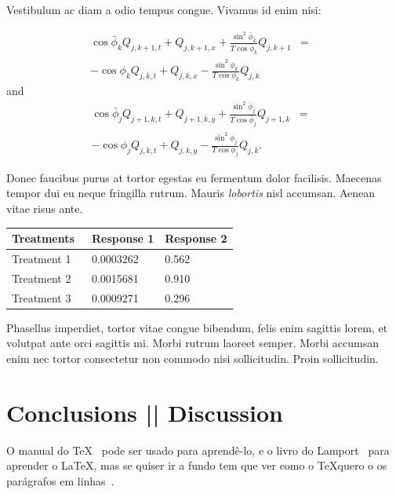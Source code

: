 \documentclass[portrait]{Hylangtechposter}
\begin{document}
\begin{multicols}{2}
Vestibulum ac diam a odio tempus congue. Vivamus id enim nisi:

\begin{eqnarray}
\cos\bar{\phi}_k Q_{j,k+1,t} + Q_{j,k+1,x}+\frac{\sin^2\bar{\phi}_k}{T\cos\bar{\phi}_k} Q_{j,k+1} &=&\nonumber\\ 
-\cos\phi_k Q_{j,k,t} + Q_{j,k,x}-\frac{\sin^2\phi_k}{T\cos\phi_k} Q_{j,k}\label{edgek}
\end{eqnarray}
and
\begin{eqnarray}
\cos\bar{\phi}_j Q_{j+1,k,t} + Q_{j+1,k,y}+\frac{\sin^2\bar{\phi}_j}{T\cos\bar{\phi}_j} Q_{j+1,k}&=&\nonumber \\
-\cos\phi_j Q_{j,k,t} + Q_{j,k,y}-\frac{\sin^2\phi_j}{T\cos\phi_j} Q_{j,k}.\label{edgej}
\end{eqnarray} 

Donec faucibus purus at tortor egestas eu fermentum dolor
facilisis. Maecenas tempor dui eu neque fringilla rutrum. Mauris
\emph{lobortis} nisl accumsan. Aenean vitae risus ante.
%

\vspace{1cm}
\begin{center}
\begin{tabular}{l l l}
\toprule
\textbf{Treatments}~ & \textbf{Response 1} & \textbf{Response 2}\\
\midrule
Treatment 1 & 0.0003262 & 0.562 \\
Treatment 2 & 0.0015681 & 0.910 \\
Treatment 3 & 0.0009271 & 0.296 \\
\bottomrule
\end{tabular}
\end{center}
\vspace{1cm}

Phasellus imperdiet, tortor vitae congue bibendum, felis enim sagittis
lorem, et volutpat ante orci sagittis mi. Morbi rutrum laoreet
semper. Morbi accumsan enim nec tortor consectetur non commodo nisi
sollicitudin. Proin sollicitudin.

\section{Conclusions || Discussion }

O manual do \TeX~\cite{knuth1986} pode ser usado para aprendê-lo, e o livro do
Lamport~\cite{lamport1994} para aprender o \LaTeX, mas se quiser ir a fundo tem
que ver como o \TeX quero o os parágrafos em linhas~\cite{knuth1981}.



\end{multicols}
\end{document}
